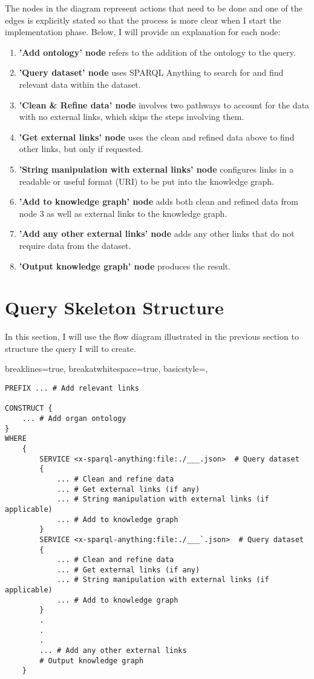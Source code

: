 The nodes in the diagram represent actions that need to be done and one of the edges is explicitly stated so that the process is more clear when I start the implementation phase. Below, I will provide an explanation for each node: 

\begin{enumerate}
  \item \textbf{'Add ontology' node} refers to the addition of the ontology to the query.
  \item \textbf{'Query dataset' node} uses SPARQL Anything to search for and find relevant data within the dataset.
  \item \textbf{'Clean \& Refine data' node} involves two pathways to account for the data with no external links, which skips the steps involving them.
  \item \textbf{'Get external links' node} uses the clean and refined data above to find other links, but only if requested.
  \item \textbf{'String manipulation with external links' node} configures links in a readable or useful format (URI) to be put into the knowledge graph.
  \item \textbf{'Add to knowledge graph' node} adds both clean and refined data from node 3 as well as external links to the knowledge graph.
  \item \textbf{'Add any other external links' node} adds any other links that do not require data from the dataset.
  \item \textbf{'Output knowledge graph' node} produces the result.
\end{enumerate}

\section{Query Skeleton Structure}
\hspace{0.5cm} In this section, I will use the flow diagram illustrated in the previous section to structure the query I will to create.

\lstset
{
    breaklines=true,
    breakatwhitespace=true,
    basicstyle=\ttfamily,
}
\begin{lstlisting}
PREFIX ... # Add relevant links

CONSTRUCT {
    ... # Add organ ontology
} 
WHERE 
    { 
        SERVICE <x-sparql-anything:file:./___.json>  # Query dataset
        { 
            ... # Clean and refine data
            ... # Get external links (if any)
            ... # String manipulation with external links (if applicable)
            ... # Add to knowledge graph
        } 
        SERVICE <x-sparql-anything:file:./___`.json>  # Query dataset
        { 
            ... # Clean and refine data
            ... # Get external links (if any)
            ... # String manipulation with external links (if applicable)
            ... # Add to knowledge graph
        } 
        .
        .
        .
        ... # Add any other external links 
        # Output knowledge graph
    }

\end{lstlisting}

